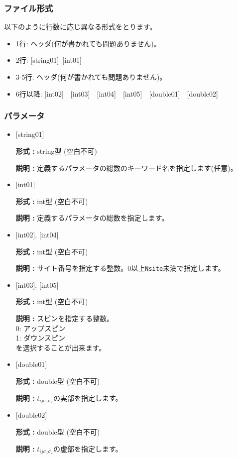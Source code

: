 \subsubsection{ファイル形式}
以下のように行数に応じ異なる形式をとります。
 \begin{itemize}
   \item  1行:  ヘッダ(何が書かれても問題ありません)。
   \item  2行:   [string01]~[int01]
   \item  3-5行:  ヘッダ(何が書かれても問題ありません)。
   \item  6行以降: [int02]~~[int03]~~[int04]~~[int05]~~[double01]~~[double02] 
  \end{itemize}
\subsubsection{パラメータ}
 \begin{itemize}

   \item  $[$string01$]$
   
    {\bf 形式 :} string型 (空白不可)

   {\bf 説明 :} 定義するパラメータの総数のキーワード名を指定します(任意)。

   \item  $[$int01$]$
   
    {\bf 形式 :} int型 (空白不可)

   {\bf 説明 :} 定義するパラメータの総数を指定します。

  \item  $[$int02$]$, $[$int04$]$

 {\bf 形式 :} int型 (空白不可)

{\bf 説明 :} サイト番号を指定する整数。0以上\verb|Nsite|{未満}で指定します。
 
  \item  $[$int03$]$, $[$int05$]$

 {\bf 形式 :} int型 (空白不可)

{\bf 説明 :} スピンを指定する整数。\\
0: アップスピン\\
1: ダウンスピン\\
を選択することが出来ます。


 \item  $[$double01$]$
   
   {\bf 形式 :} double型 (空白不可)

  {\bf 説明 :}  $t_{ij\sigma_1\sigma_2}$の実部を指定します。

 \item  $[$double02$]$
   
   {\bf 形式 :} double型 (空白不可)

  {\bf 説明 :}  $t_{ij\sigma_1\sigma_2}$の虚部を指定します。
\end{itemize}


